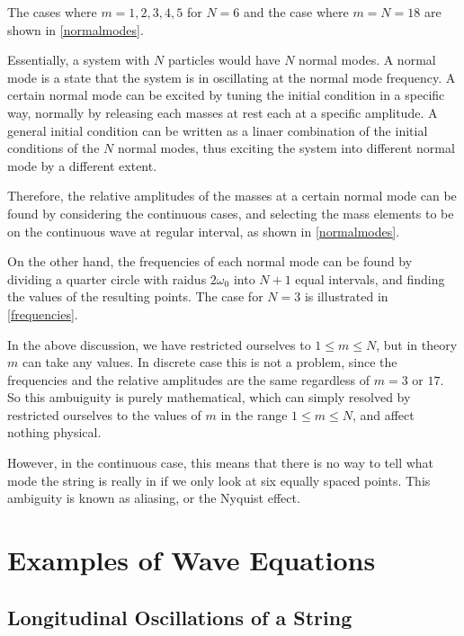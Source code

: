 \documentclass[a4paper,12pt]{report}
\begin{document}
The cases where \(m = 1,2,3,4,5\) for \(N = 6\) and the case where \(m = N = 18\) are shown in \cref{normalmodes}. 


Essentially, a system with \(N\) particles would have \(N\) normal modes. A normal mode is a state that the system is in oscillating at the normal mode frequency. A certain normal mode can be excited by tuning the initial condition in a specific way, normally by releasing each masses at rest each at a specific amplitude. A general initial condition can be written as a linaer combination of the initial conditions of the \(N\) normal modes, thus exciting the system into different normal mode by a different extent. 

Therefore, the relative amplitudes of the masses at a certain normal mode can be found by considering the continuous cases, and selecting the mass elements to be on the continuous wave at regular interval, as shown in \cref{normalmodes}. 

On the other hand, the frequencies of each normal mode can be found by dividing a quarter circle with raidus \(2 \omega _{0} \) into \(N+1\) equal intervals, and finding the values of the resulting points. The case for \(N=3\) is illustrated in \cref{frequencies}.


In the above discussion, we have restricted ourselves to \(1 \le m \le N\), but in theory \(m\) can take any values. In discrete case this is not a problem, since the frequencies and the relative amplitudes are the same regardless of \(m = 3 \text { or } 17\). So this ambuiguity is purely mathematical, which can simply resolved by restricted ourselves to the values of \(m\) in the range \(1 \le m \le N\), and affect nothing physical. 

However, in the continuous case, this means that there is no way to tell what mode the string is really in if we only look at six equally spaced points. This ambiguity is known as aliasing, or the Nyquist effect.

\section{Examples of Wave Equations}

\subsection{Longitudinal Oscillations of a String}
\end{document}
